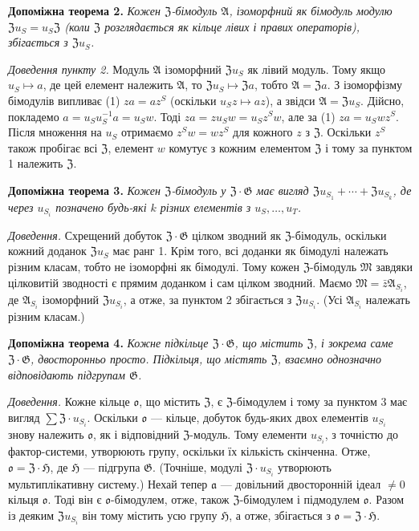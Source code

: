 \documentclass[11pt]{article}
\begin{document}
\noindent\textbf{Допоміжна теорема 2.} \emph{Кожен \(\mathfrak Z\)-бімодуль \(\mathfrak A\), ізоморфний як бімодуль модулю \(\mathfrak Zu_S=u_S\mathfrak Z\) (коли \(\mathfrak Z\) розглядається як кільце лівих і правих операторів), збігається з \(\mathfrak Zu_S\).}

\noindent\emph{Доведення пункту 2.} Модуль \(\mathfrak A\) ізоморфний \(\mathfrak Zu_S\) як лівий модуль. Тому якщо \(u_S\mapsto a\), де цей елемент належить \(\mathfrak A\), то \(\mathfrak Zu_S\mapsto\mathfrak Za\), тобто \(\mathfrak A=\mathfrak Za\). З ізоморфізму бімодулів випливає (1) \(za=az^S\) (оскільки \(u_Sz\mapsto az\)), а звідси \(\mathfrak A=\mathfrak Zu_S\). Дійсно, покладемо \(a=u_Su_S^{-1}a=u_Sw\). Тоді \(za=zu_Sw=u_Sz^Sw\), але за (1) \(za=u_Swz^S\). Після множення на \(u_S\) отримаємо \(z^Sw=wz^S\) для кожного \(z\) з \(\mathfrak Z\). Оскільки \(z^S\) також пробігає всі \(\mathfrak Z\), елемент \(w\) комутує з кожним елементом \(\mathfrak Z\) і тому за пунктом 1 належить \(\mathfrak Z\).

\noindent\textbf{Допоміжна теорема 3.} \emph{Кожен \(\mathfrak Z\)-бімодуль у \(\mathfrak Z\cdot\mathfrak G\) має вигляд \(\mathfrak Zu_{S_1}+\cdots+\mathfrak Zu_{S_k}\), де через \(u_{S_i}\) позначено будь-які \(k\) різних елементів з \(u_S,\ldots,u_T\).}

\noindent\emph{Доведення.} Схрещений добуток \(\mathfrak Z\cdot\mathfrak G\) цілком зводний як \(\mathfrak Z\)-бімодуль, оскільки кожний доданок \(\mathfrak Zu_S\) має ранг 1. Крім того, всі доданки як бімодулі належать різним класам, тобто не ізоморфні як бімодулі. Тому кожен \(\mathfrak Z\)-бімодуль \(\mathfrak M\) завдяки цілковитій зводності є прямим доданком і сам цілком зводний. Маємо \(\mathfrak M=\bar z\mathfrak A_{S_i}\), де \(\mathfrak A_{S_i}\) ізоморфний \(\mathfrak Zu_{S_i}\), а отже, за пунктом 2 збігається з \(\mathfrak Zu_{S_i}\). (Усі \(\mathfrak A_{S_i}\) належать різним класам.)

\noindent\textbf{Допоміжна теорема 4.} \emph{Кожне підкільце \(\mathfrak Z\cdot\mathfrak G\), що містить \(\mathfrak Z\), і зокрема саме \(\mathfrak Z\cdot\mathfrak G\), двосторонньо просто. Підкільця, що містять \(\mathfrak Z\), взаємно однозначно відповідають підгрупам \(\mathfrak G\).}

\noindent\emph{Доведення.} Кожне кільце \(\mathfrak o\), що містить \(\mathfrak Z\), є \(\mathfrak Z\)-бімодулем і тому за пунктом 3 має вигляд \(\sum\mathfrak Z\cdot u_{S_i}\). Оскільки \(\mathfrak o\) --- кільце, добуток будь-яких двох елементів \(u_{S_i}\) знову належить \(\mathfrak o\), як і відповідний \(\mathfrak Z\)-модуль. Тому елементи \(u_{S_i}\), з точністю до фактор-системи, утворюють групу, оскільки їх кількість скінченна. Отже, \(\mathfrak o=\mathfrak Z\cdot\mathfrak H\), де \(\mathfrak H\) --- підгрупа \(\mathfrak G\). (Точніше, модулі \(\mathfrak Z\cdot u_{S_i}\) утворюють мультиплікативну систему.) Нехай тепер \(\mathfrak a\) --- довільний двосторонній ідеал \(\neq0\) кільця \(\mathfrak o\). Тоді він є \(\mathfrak o\)-бімодулем, отже, також \(\mathfrak Z\)-бімодулем і підмодулем \(\mathfrak o\). Разом із деяким \(\mathfrak Zu_{S_i}\) він тому містить усю групу \(\mathfrak H\), а отже, збігається з \(\mathfrak o=\mathfrak Z\cdot\mathfrak H\).
\end{document}
